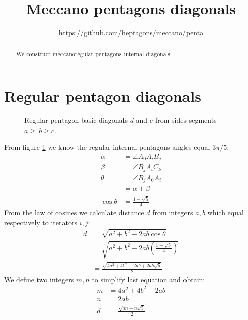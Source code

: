 \documentclass[11pt]{article}
\title{\textbf{Meccano pentagons diagonals}}
\author{https://github.com/heptagons/meccano/penta}
\date{}
\begin{document}
\maketitle
\begin{abstract}
We construct meccano\meccanoref regular pentagons internal diagonals.
\end{abstract}

\section{Regular pentagon diagonals}

\begin{figure}[H]
\centering
{}
\caption{Regular pentagon basic diagonals $d$ and $e$ from sides segments $a\ge\ b\ge c$.}
\label{fig:diagonals}
\end{figure}

From figure \ref{fig:diagonals} we know the regular internal pentagons angles equal $3\pi/5$:
\begin{align}
\alpha &= \angle{A_0A_iB_j} \\
\beta  &= \angle{B_jA_iC_k} \\
\theta &= \angle{B_jA_0A_i} \\
  &= \alpha + \beta \\
\cos\theta &= \frac{1-\sqrt{5}}{4}
\end{align}
From the law of cosines we calculate distance $d$ from integers $a,b$ which equal respectively to
iterators $i,j$:
\begin{align}
d &= \sqrt{a^2 + b^2 - 2ab\cos\theta} \nonumber\\
 &= \sqrt{a^2 + b^2 - 2ab\left(\frac{1-\sqrt{5}}{4}\right)} \nonumber\\
 &= \frac{\sqrt{4a^2 + 4b^2 - 2ab +2ab\sqrt{5}}}{2}
\end{align}
We define two integers $m, n$ to simplify last equation and obtain:
\begin{align}
m &= 4a^2 + 4b^2 - 2ab \\
n &= 2ab \\
d &= \frac{\sqrt{m + n\sqrt{5}}}{2}
\end{align}
\end{document}
